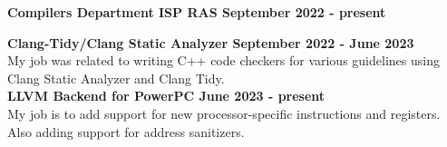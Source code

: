 \textbf{{Compilers Department ISP RAS} \hfill September 2022 - present}\par

\begin{itemize}
    \textbf{{Clang-Tidy/Clang Static Analyzer} \hfill September 2022 - June 2023} \\
  My job was related to writing C++ code checkers for various guidelines using Clang Static Analyzer and Clang Tidy. \\

    \textbf{{LLVM Backend for PowerPC} \hfill June 2023 - present}\\
    My job is to add support for new processor-specific instructions and registers. Also adding support for address sanitizers.
  
\end{itemize}\par